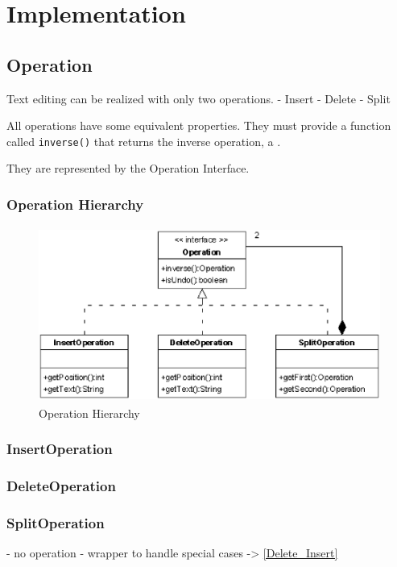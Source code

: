 
\section{Implementation}

\subsection{Operation}
Text editing can be realized with only two operations. 
 - Insert
 - Delete
 - Split

All operations have some equivalent properties. They must provide a function called \texttt{inverse()} that returns the inverse operation, a . 

They are represented by the Operation Interface.
 
\subsubsection{Operation Hierarchy}
\begin{figure}[H]
\centering
\includegraphics[height=5.74cm,width=11.59cm]{../../images/algo-impl/operation_classdiagram.eps}
\caption{Operation Hierarchy}
\label{Operation Hierarchy}
\end{figure}

\subsubsection{InsertOperation}


\subsubsection{DeleteOperation}
\subsubsection{SplitOperation}
\label{Split_Operation}
  - no operation
  - wrapper to handle special cases -> \ref{Delete_Insert}


